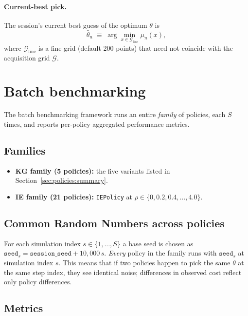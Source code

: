 \documentclass[11pt]{article}
\newcommand{\Cstar}{\theta}
\newcommand{\muN}{\mu_n}
\newcommand{\code}[1]{\texttt{#1}}
\begin{document}
\paragraph{Current-best pick.} The session's current best guess of the
optimum $\Cstar$ is
\[
  \widehat{\Cstar}_n \;\equiv\; \arg\min_{x \in \mathcal{G}_{\mathrm{fine}}} \muN(x),
\]
where $\mathcal{G}_{\mathrm{fine}}$ is a fine grid (default $200$ points)
that need not coincide with the acquisition grid $\mathcal{G}$.

\section{Batch benchmarking}
\label{sec:batch}

The batch benchmarking framework runs an entire \emph{family} of policies,
each $S$ times, and reports per-policy aggregated performance metrics.

\subsection{Families}
\label{sec:batch:families}

\begin{itemize}[nosep]
  \item \textbf{KG family (5 policies):} the five variants listed in
    Section~\ref{sec:policies:summary}.
  \item \textbf{IE family (21 policies):} \code{IEPolicy} at $\rho \in
    \{0, 0.2, 0.4, \dots, 4.0\}$.
\end{itemize}

\subsection{Common Random Numbers across policies}
\label{sec:batch:crn}

For each simulation index $s \in \{1, \dots, S\}$ a base seed is chosen as
$\code{seed}_s = \code{session\_seed} + 10{,}000\,s$. \emph{Every} policy in
the family runs with $\code{seed}_s$ at simulation index $s$. This means
that if two policies happen to pick the same $\Cstar$ at the same step
index, they see identical noise; differences in observed cost reflect only
policy differences.

\subsection{Metrics}
\label{sec:batch:metrics}
\end{document}
